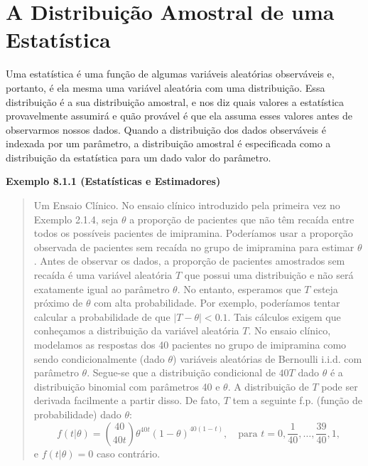 \setcounter{section}{0}
\renewcommand{\thesection}{8.\arabic{section}}

\section{A Distribuição Amostral de uma Estatística}

Uma estatística é uma função de algumas variáveis aleatórias observáveis e, portanto, é ela mesma uma variável aleatória com uma distribuição. Essa distribuição é a sua distribuição amostral, e nos diz quais valores a estatística provavelmente assumirá e quão provável é que ela assuma esses valores antes de observarmos nossos dados. Quando a distribuição dos dados observáveis é indexada por um parâmetro, a distribuição amostral é especificada como a distribuição da estatística para um dado valor do parâmetro.

\vspace{1em}
\noindent\textbf{Exemplo 8.1.1 (Estatísticas e Estimadores)}
\begin{quote}
    Um Ensaio Clínico. No ensaio clínico introduzido pela primeira vez no Exemplo 2.1.4, seja $\theta$ a proporção de pacientes que não têm recaída entre todos os possíveis pacientes de imipramina. Poderíamos usar a proporção observada de pacientes sem recaída no grupo de imipramina para estimar $\theta$. Antes de observar os dados, a proporção de pacientes amostrados sem recaída é uma variável aleatória $T$ que possui uma distribuição e não será exatamente igual ao parâmetro $\theta$. No entanto, esperamos que $T$ esteja próximo de $\theta$ com alta probabilidade. Por exemplo, poderíamos tentar calcular a probabilidade de que $|T - \theta| < 0.1$. Tais cálculos exigem que conheçamos a distribuição da variável aleatória $T$. No ensaio clínico, modelamos as respostas dos 40 pacientes no grupo de imipramina como sendo condicionalmente (dado $\theta$) variáveis aleatórias de Bernoulli i.i.d. com parâmetro $\theta$. Segue-se que a distribuição condicional de $40T$ dado $\theta$ é a distribuição binomial com parâmetros 40 e $\theta$. A distribuição de $T$ pode ser derivada facilmente a partir disso. De fato, $T$ tem a seguinte f.p. (função de probabilidade) dado $\theta$:
    $$
    f(t|\theta) = \binom{40}{40t} \theta^{40t} (1-\theta)^{40(1-t)}, \quad \text{para } t = 0, \frac{1}{40}, \dots, \frac{39}{40}, 1,
    $$
    e $f(t|\theta) = 0$ caso contrário.
\end{quote}
\vspace{1em} 

